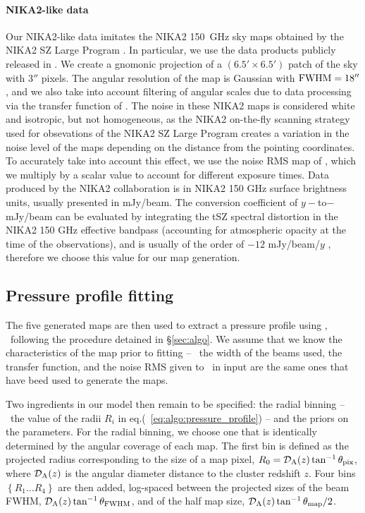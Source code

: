 \paragraph{NIKA2-like data}  %
Our NIKA2-like data imitates the NIKA2 150~GHz sky maps obtained by the NIKA2 SZ Large Program \citep{mayet_cluster_2020, perotto_nika2_2021}.
In particular, we use the data products publicly released in \citet{keruzore_exploiting_2020}.
We create a gnomonic projection of a $(6.5' \times 6.5')$ patch of the sky with $3''$ pixels.
The angular resolution of the map is Gaussian with ${\rm FWHM} = 18''$, and we also take into account filtering of angular scales due to data processing via the transfer function of \citet{keruzore_exploiting_2020}.
The noise in these NIKA2 maps is considered white and isotropic, but not homogeneous, as the NIKA2 on-the-fly scanning strategy used for obsevations of the NIKA2 SZ Large Program creates a variation in the noise level of the maps depending on the distance from the pointing coordinates.
To accurately take into account this effect, we use the noise RMS map of \citet{keruzore_exploiting_2020}, which we multiply by a scalar value to account for different exposure times.
Data produced by the NIKA2 collaboration is in NIKA2 150 GHz surface brightness units, usually presented in mJy/beam.
The conversion coefficient of $y-$to$-$mJy/beam can be evaluated by integrating the tSZ spectral distortion in the NIKA2 150 GHz effective bandpass (accounting for atmospheric opacity at the time of the observations), and is usually of the order of $-12$ mJy/beam/$y$ \citep[\eg][]{keruzore_exploiting_2020}, therefore we choose this value for our map generation.

\subsection{Pressure profile fitting} \label{sec:simu:fit}

The five generated maps are then used to extract a pressure profile using \panco, \ie\ following the procedure detained in \S\ref{sec:algo}.
We assume that we know the characteristics of the map prior to fitting -- \ie\ the width of the beams used, the transfer function, and the noise RMS given to \panco\ in input are the same ones that have beed used to generate the maps.

Two ingredients in our model then remain to be specified: the radial binning -- \ie\ the value of the radii $R_i$ in eq.(~\ref{eq:algo:pressure_profile}) -- and the priors on the parameters.
For the radial binning, we choose one that is identically determined by the angular coverage of each map.
The first bin is defined as the projected radius corresponding to the size of a map pixel, $R_0 = \mathcal{D}_{\rm A}(z) \tan^{-1} \theta_{\rm pix}$, where $\mathcal{D}_{\rm A}(z)$ is the angular diameter distance to the cluster redshift $z$.
Four bins $\left\{R_1 \dots R_4 \right\}$ are then added, log-spaced between the projected sizes of the beam FWHM, $\mathcal{D}_{\rm A}(z) \tan^{-1} \theta_{\rm FWHM}$, and of the half map size, $\mathcal{D}_{\rm A}(z) \tan^{-1} \theta_{\rm map} / 2$.

